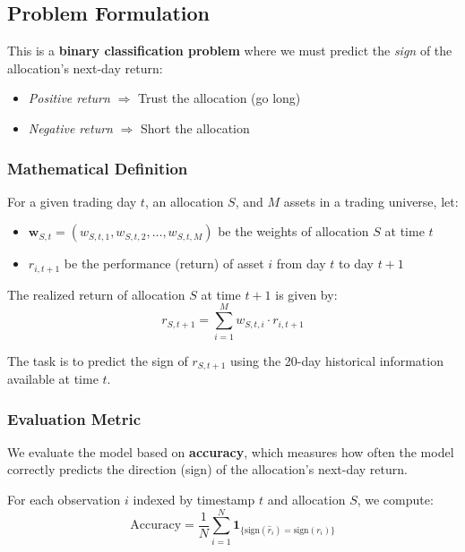 \subsection{Problem Formulation}

This is a \textbf{binary classification problem} where we must predict the \textit{sign} of the allocation's next-day return:
\begin{itemize}
      \item \textit{Positive return} $\Rightarrow$ Trust the allocation (go long)
      \item \textit{Negative return} $\Rightarrow$ Short the allocation
\end{itemize}

\subsubsection{Mathematical Definition}

For a given trading day $t$, an allocation $S$, and $M$ assets in a trading universe, let:

\begin{itemize}
      \item $\mathbf{w}_{S,t} = (w_{S,t,1}, w_{S,t,2}, \ldots, w_{S,t,M})$ be the weights of allocation $S$ at time $t$
      \item $r_{i,t+1}$ be the performance (return) of asset $i$ from day $t$ to day $t+1$
\end{itemize}

The realized return of allocation $S$ at time $t+1$ is given by:
\begin{equation}
      r_{S,t+1} = \sum_{i=1}^{M} w_{S,t,i} \cdot r_{i,t+1}
\end{equation}

The task is to predict the sign of $r_{S,t+1}$ using the 20-day historical information available at time $t$.

\subsubsection{Evaluation Metric}

We evaluate the model based on \textbf{accuracy}, which measures how often the model correctly predicts the direction (sign) of the allocation's next-day return.

For each observation $i$ indexed by timestamp $t$ and allocation $S$, we compute:
\begin{equation}
      \text{Accuracy} = \frac{1}{N} \sum_{i=1}^{N} \mathbf{1}_{\{\text{sign}(\hat{r}_i) = \text{sign}(r_i)\}}
\end{equation}

